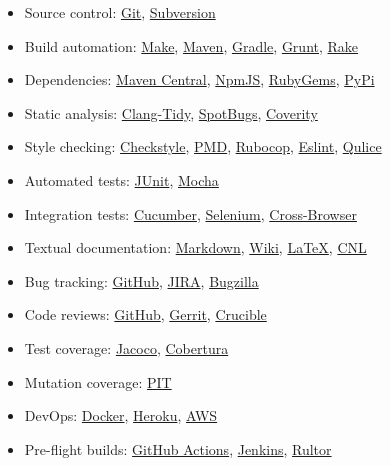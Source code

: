 \documentclass[nobrand,anonymous,nodate,nosecurity]{huawei}
\begin{document}
{\begin{itemize}
\item Source control:
	\href{https://git-scm.com}{Git},
	\href{https://subversion.apache.org}{Subversion}
\item Build automation:
	\href{https://en.wikipedia.org/wiki/Make_(software)}{Make},
	\href{https://maven.apache.org}{Maven},
	\href{https://gradle.org}{Gradle},
	\href{https://gruntjs.com}{Grunt},
	\href{https://github.com/ruby/rake}{Rake}
\item Dependencies:
	\href{https://maven.apache.org}{Maven Central},
	\href{https://www.npmjs.com}{NpmJS},
	\href{https://rubygems.org}{RubyGems},
	\href{https://pypi.org/project/pip/}{PyPi}
\item Static analysis:
	\href{https://clang.llvm.org/extra/clang-tidy/}{Clang-Tidy},
	\href{https://spotbugs.github.io}{SpotBugs},
	\href{https://scan.coverity.com}{Coverity}
\item Style checking:
  \href{https://checkstyle.sourceforge.io}{Checkstyle},
  \href{https://pmd.github.io}{PMD},
  \href{https://rubocop.org}{Rubocop},
  \href{https://eslint.org}{Eslint},
  \href{https://www.qulice.com}{Qulice}
\item Automated tests:
	\href{https://junit.org/}{JUnit},
	\href{https://mochajs.org}{Mocha}
\item Integration tests:
  \href{https://cucumber.io}{Cucumber},
  \href{https://www.selenium.dev}{Selenium},
  \href{https://en.wikipedia.org/wiki/Cross-browser_testing}{Cross-Browser}
\item Textual documentation:
	\href{https://en.wikipedia.org/wiki/Markdown}{Markdown},
	\href{https://en.wikipedia.org/wiki/Wiki}{Wiki},
	\href{https://en.wikipedia.org/wiki/LaTeX}{LaTeX},
  \href{https://en.wikipedia.org/wiki/Controlled_natural_language}{CNL}
\item Bug tracking:
	\href{github.com/}{GitHub},
	\href{https://www.atlassian.com/software/jira}{JIRA},
	\href{https://www.bugzilla.org}{Bugzilla}
\item Code reviews:
	\href{github.com/}{GitHub},
	\href{https://www.gerritcodereview.com}{Gerrit},
	\href{https://www.atlassian.com/software/crucible}{Crucible}
\item Test coverage:
	\href{https://www.eclemma.org/jacoco/}{Jacoco},
	\href{https://cobertura.github.io/cobertura/}{Cobertura}
\item Mutation coverage:
	\href{https://www.pitest.org}{PIT}
\item DevOps:
	\href{https://www.docker.com}{Docker},
	\href{https://www.heroku.com}{Heroku},
	\href{https://aws.amazon.com/}{AWS}
\item Pre-flight builds:
	\href{https://github.com/features/actions}{GitHub Actions},
	\href{https://www.jenkins.io}{Jenkins},
	\href{https://www.rultor.com}{Rultor}
\end{itemize}

}
\end{document}
